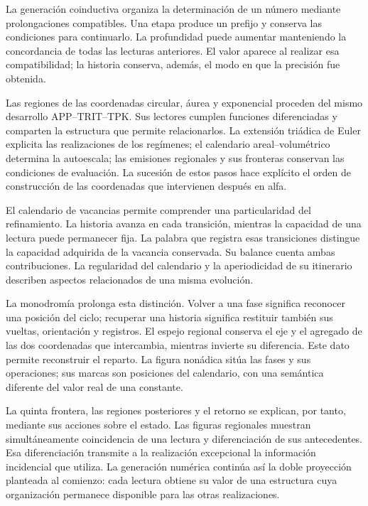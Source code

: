 
La generación coinductiva organiza la determinación de un número mediante
prolongaciones compatibles. Una etapa produce un prefijo y conserva las
condiciones para continuarlo. La profundidad puede aumentar manteniendo
la concordancia de todas las lecturas anteriores. El valor aparece al
realizar esa compatibilidad; la historia conserva, además, el modo en que
la precisión fue obtenida.

Las regiones de las coordenadas circular, áurea y exponencial proceden del
mismo desarrollo APP--TRIT--TPK. Sus lectores cumplen funciones
diferenciadas y comparten la estructura que permite relacionarlos. La
extensión triádica de Euler explicita las realizaciones de los regímenes;
el calendario areal--volumétrico determina la autoescala; las emisiones
regionales y sus fronteras conservan las condiciones de evaluación.
La sucesión de estos pasos hace explícito el orden de construcción de las
coordenadas que intervienen después en alfa.

El calendario de vacancias permite comprender una particularidad del
refinamiento. La historia avanza en cada transición, mientras la capacidad
de una lectura puede permanecer fija. La palabra que registra esas
transiciones distingue la capacidad adquirida de la vacancia conservada.
Su balance cuenta ambas contribuciones. La regularidad del calendario y
la aperiodicidad de su itinerario describen aspectos relacionados de una
misma evolución.

La monodromía prolonga esta distinción. Volver a una fase significa
reconocer una posición del ciclo; recuperar una historia significa
restituir también sus vueltas, orientación y registros. El espejo regional
conserva el eje y el agregado de las dos coordenadas que intercambia,
mientras invierte su diferencia. Este dato permite reconstruir el
reparto. La figura nonádica sitúa las fases y sus operaciones; sus marcas
son posiciones del calendario, con una semántica diferente del valor real
de una constante.

La quinta frontera, las regiones posteriores y el retorno se explican,
por tanto, mediante sus acciones sobre el estado. Las figuras regionales
muestran simultáneamente coincidencia de una lectura y diferenciación de
sus antecedentes. Esa diferenciación transmite a la realización
excepcional la información incidencial que utiliza. La generación
numérica continúa así la doble proyección planteada al comienzo: cada
lectura obtiene su valor de una estructura cuya organización permanece
disponible para las otras realizaciones.

